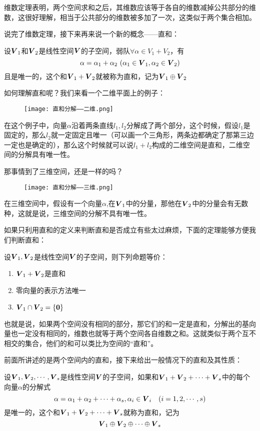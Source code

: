 \documentclass[12pt, a4paper, oneside, UTF8]{ctexbook}
\begin{document}
维数定理表明，两个空间求和之后，其维数应该等于各自的维数减掉公共部分的维数，这很好理解，相当于公共部分的维数被多加了一次，这类似于两个集合相加。

说完了维数定理，接下来再来说一个新的概念——直和：
\begin{defn}{}{}
    设$\boldsymbol{V}_1$和$\boldsymbol{V}_2$是线性空间$\boldsymbol{V}$的子空间，弱队$\forall \alpha\in V_1+V_2$，有\[\alpha=\alpha_1+\alpha_2\ (\alpha_1\in \boldsymbol{V}_1, \alpha_2\in\boldsymbol{V}_2)\]且是唯一的，这个和$\boldsymbol{V}_1+\boldsymbol{V}_2$就被称为直和，记为$\boldsymbol{V}_1\oplus\boldsymbol{V}_2$
\end{defn}

如何理解直和呢？我们来看一个二维平面上的例子：
\begin{figure}[h]
    \centering
    \texttt{[image: 直和分解——二维.png]}
\end{figure}

在这个例子中，向量$\alpha$沿着两条直线$l_1,l_2$分解成了两个部分，这个时候，假设$l_1$是固定的，那么$l_2$就一定固定且唯一（可以画一个三角形，两条边都确定了那第三边一定也是确定的），那么这个时候就可以说$l_1+l_2$构成的二维空间是直和，二维空间的分解具有唯一性。

那事情到了三维空间，还是一样的吗？
\begin{figure}[h]
    \centering
    \texttt{[image: 直和分解——三维.png]}
\end{figure}

在三维空间中，假设有一个向量$\alpha$,在$\boldsymbol{V}_1$中的分量，那他在$\boldsymbol{V}_2$中的分量会有无数种，这就是说，三维空间的分解不具有唯一性。

如果只利用直和的定义来判断直和是否成立有些太过麻烦，下面的定理能够方便我们判断直和：
\begin{them}{}{}
    设$\boldsymbol{V}_1, \boldsymbol{V}_2$是线性空间$\boldsymbol{V}$的子空间，则下列命题等价：
    \begin{enumerate}
        \item $\boldsymbol{V}_1+\boldsymbol{V}_2$是直和
        \item 零向量的表示方法唯一
        \item $\boldsymbol{V}_1\cap\boldsymbol{V}_2=\{\boldsymbol{0}\}$
    \end{enumerate}
\end{them}

也就是说，如果两个空间没有相同的部分，那它们的和一定是直和，分解出的基向量也一定没有相同的，维数也就等于两个空间各自维数之和。这就类似于两个互不相交的集合，他们的和可以类比为空间的“直和”。

前面所讲述的是两个空间内的直和，接下来给出一般情况下的直和及其性质：
\begin{defn}{}{}
    设$\boldsymbol{V}_1,\boldsymbol{V}_2,\cdots,\boldsymbol{V}_s$是线性空间$\boldsymbol{V}$的子空间，如果和$\boldsymbol{V}_1+\boldsymbol{V}_2+\cdots+\boldsymbol{V}_s$中的每个向量$\alpha$的分解式\[\alpha=\alpha_1+\alpha_2+\cdots+\alpha_s, \alpha_i\in\boldsymbol{V}_i\ \ \ (i=1,2,\cdots,s)\]是唯一的，这个和$\boldsymbol{V}_1+\boldsymbol{V}_2+\cdots+\boldsymbol{V}_s$就称为直和，记为\[\boldsymbol{V}_1\oplus\boldsymbol{V}_2\oplus\cdots\oplus\boldsymbol{V}_s\]
\end{defn}
\end{document}

